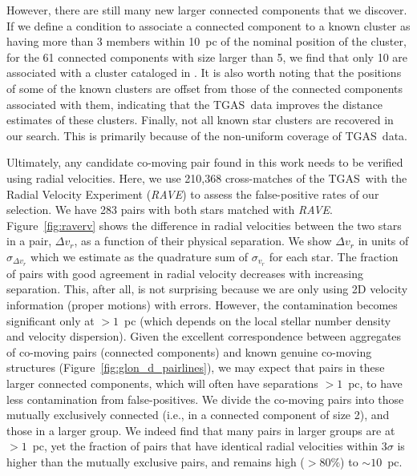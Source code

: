\documentclass[manuscript, letterpaper]{aastex6}
\newcommand{\project}[1]{\textsl{#1}}
\newcommand{\acronym}[1]{{\small{#1}}}
\newcommand{\rave}{\project{\acronym{RAVE}}}
\newcommand{\tgas}{\acronym{TGAS}}
\begin{document}
However, there are still many new larger connected components that we
discover.
If we define a condition to associate a connected component to a known cluster
as having more than 3 members within 10~pc of the nominal position of
the cluster, for the 61 connected components with size larger than 5,
we find that only 10 are associated with a cluster cataloged in
\citet{Kharchenko:2016aa}.
It is also worth noting that the positions of some of the known clusters
are offset from those of the connected components associated with them,
indicating that the \tgas\ data improves the distance estimates of these clusters.
Finally, not all known star clusters are recovered in our search.
This is primarily because of the non-uniform coverage of \tgas\ data.

Ultimately, any candidate co-moving pair found in this work
needs to be verified using radial velocities.
Here, we use 210,368 cross-matches of the \tgas\ with
the Radial Velocity Experiment (\rave) to
assess the false-positive rates of our selection.
We have 283 pairs with both stars matched with \rave.
Figure~\ref{fig:raverv} shows the difference in radial velocities
between the two stars in a pair, $\Delta v_r$, as a function of their physical separation.
We show $\Delta v_r$ in units of $\sigma_{\Delta v_r}$ which we estimate
as the quadrature sum of $\sigma _{v_r}$ for each star.
The fraction of pairs with good agreement in radial velocity decreases with
increasing separation.
This, after all, is not surprising because we are only using
2D velocity information (proper motions) with errors.
However, the contamination becomes significant only at $>1$~pc
(which depends on the local stellar number density and velocity dispersion).
Given the excellent correspondence between
aggregates of co-moving pairs (connected components)
and known genuine co-moving structures (Figure~\ref{fig:glon_d_pairlines}),
we may expect that pairs in these larger connected components,
which will often have separations $>1$~pc,
to have less contamination from false-positives.
We divide the co-moving pairs into those
mutually exclusively connected (i.e., in a connected component of
size 2), and those in a larger group.
We indeed find that many pairs in larger groups are at $>1$~pc, yet
the fraction of pairs that have identical radial velocities within $3\sigma$ is
higher than the mutually exclusive pairs, and remains high ($>80\%$) to $\sim 10$~pc.
\end{document}
